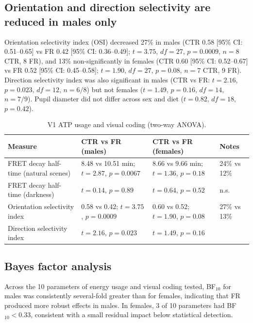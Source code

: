 \documentclass[11pt]{article}
\begin{document}
\subsection{Orientation and direction selectivity are reduced in males only}
Orientation selectivity index (OSI) decreased 27\% in males (CTR 0.58 [95\% CI: 0.51--0.65] vs FR 0.42 [95\% CI: 0.36--0.49]; $t = 3.75$, $df = 27$, $p = 0.0009$, $n = 8$ CTR, 8 FR), and 13\% non-significantly in females (CTR 0.60 [95\% CI: 0.52--0.67] vs FR 0.52 [95\% CI: 0.45--0.58]; $t = 1.90$, $df = 27$, $p = 0.08$, $n = 7$ CTR, 9 FR). Direction selectivity index was also significant in males (CTR vs FR: $t = 2.16$, $p = 0.023$, $df = 12$, $n = 6/8$) but not females ($t = 1.49$, $p = 0.16$, $df = 14$, $n = 7/9$). Pupil diameter did not differ across sex and diet ($t = 0.82$, $df = 18$, $p = 0.42$).

\begin{table}[h]
\centering
\caption{V1 ATP usage and visual coding (two-way ANOVA).}
\begin{tabular}{llll}
\toprule
Measure & CTR vs FR (males) & CTR vs FR (females) & Notes \\
\midrule
FRET decay half-time (natural scenes) & 8.48 vs 10.51 min; $t=2.87$, $p=0.0067$ & 8.66 vs 9.66 min; $t=1.36$, $p=0.18$ & 24\% vs 12\% \\
FRET decay half-time (darkness) & $t=0.14$, $p=0.89$ & $t=0.64$, $p=0.52$ & n.s. \\
Orientation selectivity index & 0.58 vs 0.42; $t=3.75$, $p=0.0009$ & 0.60 vs 0.52; $t=1.90$, $p=0.08$ & 27\% vs 13\% \\
Direction selectivity index & $t=2.16$, $p=0.023$ & $t=1.49$, $p=0.16$ & \\
\bottomrule
\end{tabular}
\end{table}

\subsection{Bayes factor analysis}
Across the 10 parameters of energy usage and visual coding tested, BF$_{10}$ for males was consistently several-fold greater than for females, indicating that FR produced more robust effects in males. In females, 3 of 10 parameters had BF$_{10} < 0.33$, consistent with a small residual impact below statistical detection.
\end{document}
